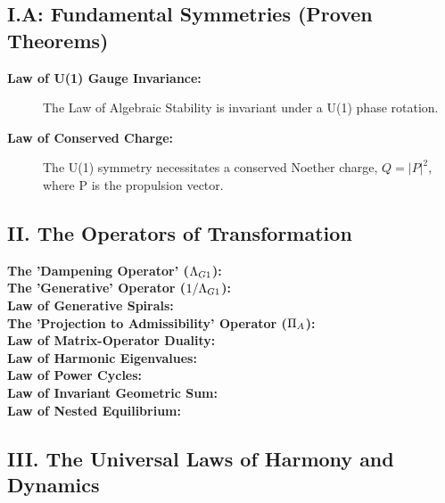 \vspace{1cm}
\subsection*{I.A: Fundamental Symmetries (Proven Theorems)}
\begin{description}
    \item[\bfseries Law of U(1) Gauge Invariance:] The Law of Algebraic Stability is invariant under a U(1) phase rotation.
    \item[\bfseries Law of Conserved Charge:] The U(1) symmetry necessitates a conserved Noether charge, $Q = |P|^2$, where P is the propulsion vector.
\end{description}

\vspace{1cm} %
\subsection*{II. The Operators of Transformation}
\begin{description}
    \item[\bfseries The 'Dampening Operator' ($\Lambda_{G1}$):] 
    \item[\bfseries The 'Generative' Operator ($1/\Lambda_{G1}$):] 
    \item[\bfseries Law of Generative Spirals:] 
    \item[\bfseries The 'Projection to Admissibility' Operator ($\Pi_{A}$):] 
    \item[\bfseries Law of Matrix-Operator Duality:]     
    \item[\bfseries Law of Harmonic Eigenvalues:] 
    \item[\bfseries Law of Power Cycles:] 
    \item[\bfseries Law of Invariant Geometric Sum:] 
    \item[\bfseries Law of Nested Equilibrium:] 
\end{description}

\vspace{1cm}
\subsection*{III. The Universal Laws of Harmony and Dynamics}

